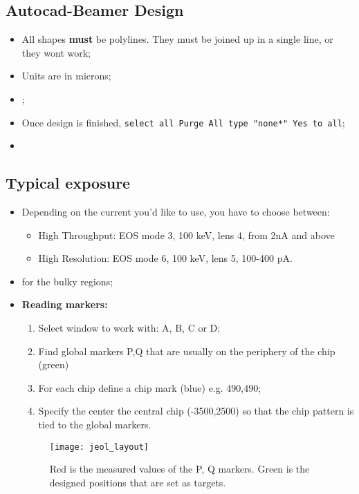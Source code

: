 \newpage \subsection{Autocad-Beamer Design}
\label{sec:autocad-design}

\begin{itemize}
\item All shapes \textbf{must} be polylines.  They must be joined up in
  a single line, or they wont work;
\item Units are in microns;
\item {};
\item Once design  is finished, \texttt{select all \ira  Purge \ira All
    \ira type "none*" \ira Yes to all};

\item {}
\end{itemize}

\newpage\subsection{Typical exposure}
\label{sec:typic-expos-param}
\begin{itemize}
\item Depending  on the current you'd  like to use, you  have to choose
  between:
  \begin{itemize}
  \item High  Throughput: EOS  mode 3,  100 keV, lens  4, from  2nA and
    above
  \item High Resolution: EOS mode 6, 100 keV, lens 5, 100-400 pA.
  \end{itemize}
\item {} for the bulky regions;
\item \textbf{Reading markers:}
  \begin{enumerate}
  \item Select window to work with: A, B, C or D;
  \item Find  global markers P,Q that  are usually on the  periphery of
    the chip (green)
  \item For each chip define a chip mark (blue) e.g. 490,490;
  \item Specify  the center the  central chip (-3500,2500) so  that the
    chip pattern is tied to the global markers.
  \end{enumerate}
  \begin{figure}[h]
    \centering \texttt{[image: jeol\_layout]}
    \caption{\small Red  is the  measured values of  the P,  Q markers.
      Green   is    the   designed   positions   that    are   set   as
      targets. \label{fig:jeol_layout}}
  \end{figure}
\end{itemize}

